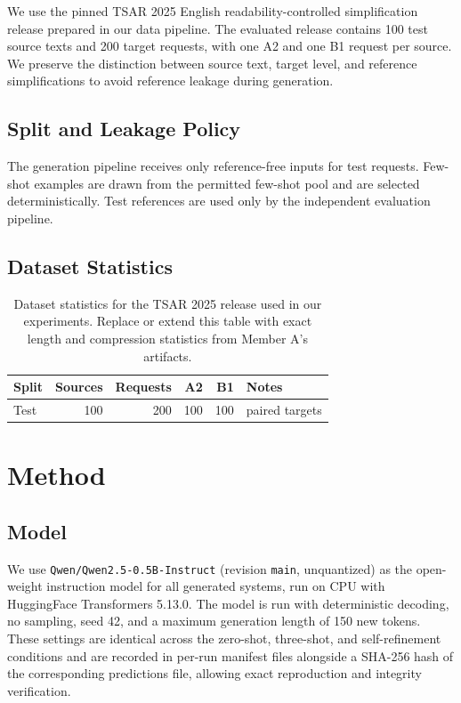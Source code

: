 \documentclass[11pt]{article}
\begin{document}
We use the pinned TSAR 2025 English readability-controlled simplification release prepared in our data pipeline. The evaluated release contains 100 test source texts and 200 target requests, with one A2 and one B1 request per source. We preserve the distinction between source text, target level, and reference simplifications to avoid reference leakage during generation.

\subsection{Split and Leakage Policy}

The generation pipeline receives only reference-free inputs for test requests. Few-shot examples are drawn from the permitted few-shot pool and are selected deterministically. Test references are used only by the independent evaluation pipeline.

\subsection{Dataset Statistics}

\begin{table}[t]
\centering
\small
\begin{tabular}{lrrrrl}
\toprule
Split & Sources & Requests & A2 & B1 & Notes \\
\midrule
Test & 100 & 200 & 100 & 100 & paired targets \\
\bottomrule
\end{tabular}
\caption{Dataset statistics for the TSAR 2025 release used in our experiments. Replace or extend this table with exact length and compression statistics from Member A's artifacts.}
\label{tab:data-stats}
\end{table}

\section{Method}

\subsection{Model}

We use \texttt{Qwen/Qwen2.5-0.5B-Instruct} (revision \texttt{main}, unquantized) as the open-weight instruction model for all generated systems, run on CPU with HuggingFace Transformers 5.13.0. The model is run with deterministic decoding, no sampling, seed 42, and a maximum generation length of 150 new tokens. These settings are identical across the zero-shot, three-shot, and self-refinement conditions and are recorded in per-run manifest files alongside a SHA-256 hash of the corresponding predictions file, allowing exact reproduction and integrity verification.
\end{document}
